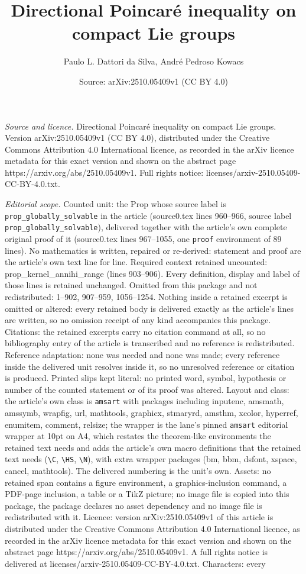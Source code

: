 \documentclass[10pt,a4paper]{amsart}
\title[Directional Poincar\'e inequality on compact Lie groups]{Directional Poincar\'e inequality on compact Lie groups}
\author{Paulo L. Dattori da Silva, Andr\'e Pedroso Kowacs}
\date{Source: arXiv:2510.05409v1 (CC BY 4.0)}
\begin{document}
\maketitle

\noindent\emph{Source and licence.} Directional Poincar\'e inequality on compact Lie groups. Version arXiv:2510.05409v1 (CC BY 4.0), distributed under the Creative Commons Attribution 4.0 International licence, as recorded in the arXiv licence metadata for this exact version and shown on the abstract page https://arxiv.org/abs/2510.05409v1. Full rights notice: licenses/arxiv-2510.05409-CC-BY-4.0.txt.\par\smallskip

\noindent\textit{Editorial scope.} Counted unit: the Prop whose source label is \texttt{prop\_globally\_solvable} in the article (source0.tex lines 960--966, source label \texttt{prop\_globally\_solvable}), delivered together with the article's own complete original proof of it (source0.tex lines 967--1055, one \texttt{proof} environment of 89 lines). No mathematics is written, repaired or re-derived: statement and proof are the article's own text line for line. Required context retained uncounted: prop\_kernel\_annihi\_range (lines 903--906). Every definition, display and label of those lines is retained unchanged. Omitted from this package and not redistributed: 1--902, 907--959, 1056--1254. Nothing inside a retained excerpt is omitted or altered: every retained body is delivered exactly as the article's lines are written, so no omission receipt of any kind accompanies this package. Citations: the retained excerpts carry no citation command at all, so no bibliography entry of the article is transcribed and no reference is redistributed. Reference adaptation: none was needed and none was made; every reference inside the delivered unit resolves inside it, so no unresolved reference or citation is produced. Printed slips kept literal: no printed word, symbol, hypothesis or number of the counted statement or of its proof was altered. Layout and class: the article's own class is \texttt{amsart} with packages including inputenc, amsmath, amssymb, wrapfig, url, mathtools, graphicx, stmaryrd, amsthm, xcolor, hyperref, enumitem, comment, relsize; the wrapper is the lane's pinned \texttt{amsart} editorial wrapper at 10pt on A4, which restates the theorem-like environments the retained text needs and adds the article's own macro definitions that the retained text needs (\texttt{\textbackslash C}, \texttt{\textbackslash HS}, \texttt{\textbackslash N}), with extra wrapper packages (bm, bbm, dsfont, xspace, cancel, mathtools). The delivered numbering is the unit's own. Assets: no retained span contains a figure environment, a graphics-inclusion command, a PDF-page inclusion, a table or a TikZ picture; no image file is copied into this package, the package declares no asset dependency and no image file is redistributed with it. Licence: version arXiv:2510.05409v1 of this article is distributed under the Creative Commons Attribution 4.0 International licence, as recorded in the arXiv licence metadata for this exact version and shown on the abstract page https://arxiv.org/abs/2510.05409v1. A full rights notice is delivered at licenses/arxiv-2510.05409-CC-BY-4.0.txt. Characters: every 
\end{document}
